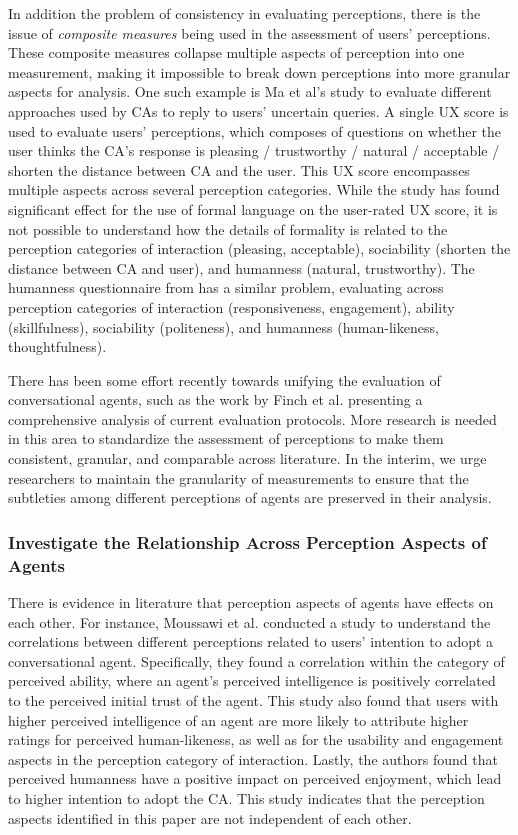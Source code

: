 In addition the problem of consistency in evaluating perceptions, there is the issue of  \textit{composite measures} being used in the assessment of users' perceptions. These composite measures collapse multiple aspects of perception into one measurement, making it impossible to break down perceptions into more granular aspects for analysis. One such example is Ma et al's study \cite{ma2022ask}\cmt{[29]} to evaluate different approaches used by CAs to reply to users' uncertain queries. A single UX score is used to evaluate users' perceptions, which composes of questions on whether the user thinks the CA's response is pleasing / trustworthy / natural / acceptable / shorten the distance between CA and the user. This UX score encompasses multiple aspects across several perception categories. While the study has found significant effect for the use of formal language on the user-rated UX score, it is not possible to understand how the details of formality is related to the perception categories of interaction (pleasing, acceptable), sociability (shorten the distance between CA and user), and humanness (natural, trustworthy). The humanness questionnaire from \citet{holtgraves2007perceiving} has a similar problem, evaluating across perception categories of interaction (responsiveness, engagement), ability (skillfulness), sociability (politeness), and humanness (human-likeness, thoughtfulness).

There has been some effort recently towards unifying the evaluation of conversational agents, such as the work by Finch et al. \cite{finch2020towards} presenting a comprehensive analysis of current evaluation protocols. More research is needed in this area to standardize the assessment of perceptions to make them consistent, granular, and comparable across literature. In the interim, we urge researchers to maintain the granularity of measurements to ensure that the subtleties among different perceptions of agents are preserved in their analysis.

\subsubsection{Investigate the Relationship Across Perception Aspects of Agents}

There is evidence in literature that perception aspects of agents have effects on each other. For instance, Moussawi et al. \cite{moussawi2021perceptions}\cmt{[36]} conducted a study to understand the correlations between different perceptions related to users' intention to adopt a conversational agent. Specifically, they found a correlation within the category of perceived ability, where an agent's perceived intelligence is positively correlated to the perceived initial trust of the agent. This study also found that users with higher perceived intelligence of an agent are more likely to attribute higher ratings for perceived human-likeness, as well as for the usability and engagement aspects in the perception category of interaction. Lastly, the authors found that perceived humanness have a positive impact on perceived enjoyment, which lead to higher intention to adopt the CA. This study indicates that the perception aspects identified in this paper are not independent of each other.

